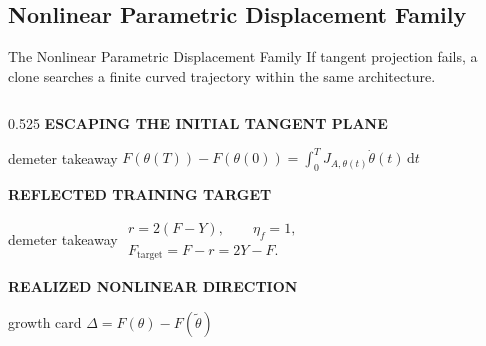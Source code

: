 \subsection{Nonlinear Parametric Displacement Family}

\begin{frame}[t]{The Nonlinear Parametric Displacement Family}
  \vspace{-0.18cm}
  {\fontsize{7.5}{8.9}\selectfont
  If tangent projection fails, a clone searches a finite curved trajectory
  within the same architecture.}

  \vspace{0.10cm}
  \begin{columns}[T,onlytextwidth]
    \begin{column}{0.525\textwidth}
      {\color{EnstaBlue}\bfseries\scriptsize ESCAPING THE INITIAL TANGENT PLANE}
      \vspace{0.04cm}

      \begin{beamercolorbox}[rounded=true,sep=0.11cm,wd=\linewidth]{demeter takeaway}
        \centering
        \fontsize{6.9}{8.2}\selectfont
        \(\displaystyle
          F(\theta(T))-F(\theta(0))
          =\int_0^T J_{A,\theta(t)}\dot\theta(t)\,\mathrm dt
        \)
      \end{beamercolorbox}

      \vspace{0.10cm}
      {\color{EnstaBlue}\bfseries\scriptsize REFLECTED TRAINING TARGET}
      \vspace{0.04cm}

      \begin{beamercolorbox}[rounded=true,sep=0.11cm,wd=\linewidth]{demeter takeaway}
        \centering
        \fontsize{7.0}{8.3}\selectfont
        \(\displaystyle
          \begin{gathered}
            r=2(F-Y),\qquad \eta_f=1,\\[4pt]
            F_{\mathrm{target}}=F-r=2Y-F.
          \end{gathered}
        \)
      \end{beamercolorbox}

      \vspace{0.10cm}
      {\color{EnstaBlue}\bfseries\scriptsize REALIZED NONLINEAR DIRECTION}
      \vspace{0.04cm}

      \begin{beamercolorbox}[rounded=true,sep=0.11cm,wd=\linewidth]{growth card}
        \centering
        \fontsize{7.0}{8.3}\selectfont
        \(\displaystyle
          \Delta=F(\theta)-F(\widetilde\theta)
        \)
      \end{beamercolorbox}


\end{column}
\end{columns}
\end{frame}
